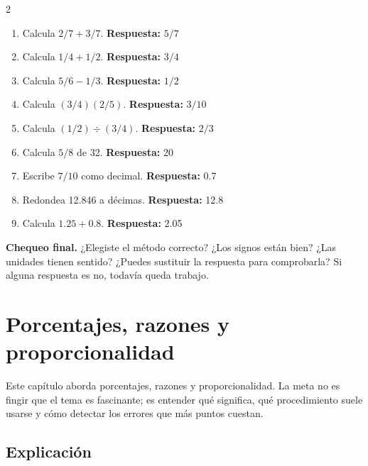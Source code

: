 \documentclass[10pt,oneside,openany]{book}
\begin{document}
\begin{multicols}{2}\begin{enumerate}

\item Calcula $2/7+3/7$. \textbf{Respuesta:} $5/7$

\item Calcula $1/4+1/2$. \textbf{Respuesta:} $3/4$

\item Calcula $5/6-1/3$. \textbf{Respuesta:} $1/2$

\item Calcula $(3/4)(2/5)$. \textbf{Respuesta:} $3/10$

\item Calcula $(1/2)\div(3/4)$. \textbf{Respuesta:} $2/3$

\item Calcula $5/8$ de 32. \textbf{Respuesta:} 20

\item Escribe $7/10$ como decimal. \textbf{Respuesta:} 0.7

\item Redondea 12.846 a décimas. \textbf{Respuesta:} 12.8

\item Calcula $1.25+0.8$. \textbf{Respuesta:} 2.05

\end{enumerate}\end{multicols}

\begin{idea}\textbf{Chequeo final.} ¿Elegiste el método correcto? ¿Los signos están bien? ¿Las unidades tienen sentido? ¿Puedes sustituir la respuesta para comprobarla? Si alguna respuesta es no, todavía queda trabajo.\end{idea}



\chapter{Porcentajes, razones y proporcionalidad}

\begin{idea}
Este capítulo aborda porcentajes, razones y proporcionalidad. La meta no es fingir que el tema es fascinante; es entender qué significa, qué procedimiento suele usarse y cómo detectar los errores que más puntos cuestan.
\end{idea}

\section{Explicación}
\end{document}
